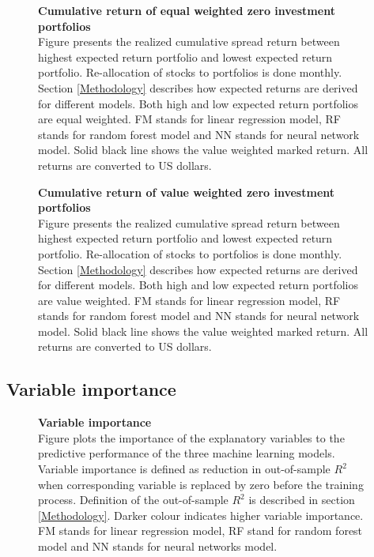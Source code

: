 \documentclass{article}
\begin{document}
\begin{figure}[ht]
\centering
\caption[Cumulative return of equal weighted zero investment portfolios]{\textbf{Cumulative return of equal weighted zero investment portfolios}\\ Figure presents the realized cumulative spread return between highest expected return portfolio and lowest expected return portfolio. Re-allocation of stocks to portfolios is done monthly. Section \ref{Methodology} describes how expected returns are derived for different models. Both high and low expected return portfolios are equal weighted. FM stands for linear regression model, RF stands for random forest model and NN stands for neural network model. Solid black line shows the value weighted marked return. All returns are converted to US dollars.}

\label{plot:cumul_ew_LS_portf_return}
\end{figure}

\begin{figure}[ht]
\centering
\caption[Cumulative return of value weighted zero investment portfolios]{\textbf{Cumulative return of value weighted zero investment portfolios}\\ Figure presents the realized cumulative spread return between highest expected return portfolio and lowest expected return portfolio. Re-allocation of stocks to portfolios is done monthly. Section \ref{Methodology} describes how expected returns are derived for different models. Both high and low expected return portfolios are value weighted. FM stands for linear regression model, RF stands for random forest model and NN stands for neural network model. Solid black line shows the value weighted marked return. All returns are converted to US dollars.}

\label{plot:cumul_vw_LS_portf_return}
\end{figure}

\subsection{Variable importance}\label{VariableImportance}

\begin{figure}[ht]
\centering
\caption[Variable importance]{\textbf{Variable importance}\\ Figure plots the importance of the explanatory variables to the predictive performance of the three machine learning models. Variable importance is defined as reduction in out-of-sample $R^2$ when corresponding variable is replaced by zero before the training process. Definition of the out-of-sample $R^2$ is described in section \ref{Methodology}. Darker colour indicates higher variable importance. FM stands for linear regression model, RF stand for random forest model and NN stands for neural networks model.}

\label{plot:combined_VI}
\end{figure}
\end{document}
